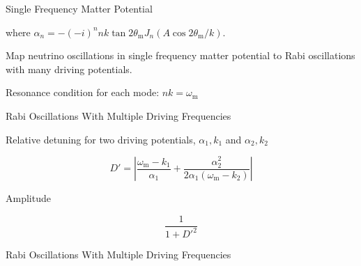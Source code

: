 \documentclass[9pt]{beamer}
\begin{document}
\begin{darkframes}
\begin{frame}{Single Frequency Matter Potential}
\begin{tcolorbox}[title=Hamiltonian in Rabi Basis]
where $\alpha_n =  - (-i)^n  n  k \tan 2\theta_{\mathrm{m}}  J_n ( A \cos 2\theta_{\mathrm{m}} / k )$.


\end{tcolorbox}







\begin{tcolorbox}
\centering
Map neutrino oscillations in single frequency matter potential to Rabi oscillations with many driving potentials.
\end{tcolorbox}

\pause
\begin{tcolorbox}
\centering
Resonance condition for each mode: $nk=\omega_{\mathrm m}$
\end{tcolorbox}




\end{frame}



\begin{frame}{Rabi Oscillations With Multiple Driving Frequencies}




Relative detuning for two driving potentials, $\alpha_1,k_1$ and $\alpha_2, k_2$

\begin{equation*}
D' =  \left\vert \frac{\omega_{\mathrm m} - k_1 }{\alpha_1} + \frac{\alpha_2^2}{2\alpha_1(\omega_{\mathrm m}-k_2)} \right\vert
\end{equation*}

Amplitude

\begin{equation*}
   \frac{1}{1+D'^2}
\end{equation*}

\end{frame}


\begin{frame}{Rabi Oscillations With Multiple Driving Frequencies}




\end{frame}
\end{darkframes}
\end{document}
